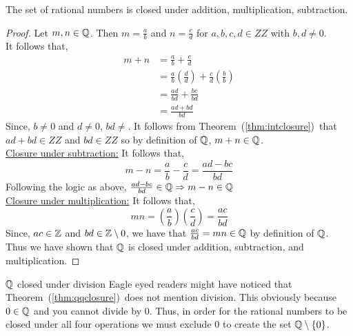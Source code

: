 \begin{tcolorbox}[colback=pink!70]
\begin{theorem}{\label{thm:qqclosure}}
    The set of rational numbers is closed under addition, multiplication, subtraction.
\end{theorem}
\begin{proof}
    Let $m, n \in \mathbb Q$. Then $m = \frac{a}{b}$ and $n = \frac{c}{d}$ for $a, b, c, d \in ZZ$ with $b, d \neq 0$.\\
     It follows that, 
    \begin{align*}
        m + n &= \frac{a}{b} + \frac{c}{d} \\
        &= \frac{a}{b}\left(\frac{d}{d}\right) + \frac{c}{d}\left(\frac{b}{b}\right) \\
        &= \frac{ad}{bd} + \frac{bc}{bd} \\
        &= \frac{ad + bd}{bd}
    \end{align*}
    Since, $b \neq 0$ and $d \neq 0$, $bd \neq$. It follows from Theorem~(\ref{thm:intclosure})~that $ad + bd \in ZZ$ and $bd \in ZZ$ so by definition of $\mathbb Q$, $m +n \in \mathbb Q$. \\

    \hspace*{2em} \underline{Closure under subtraction:} It follows that,
    \begin{equation*}
        m - n = \frac{a}{b} - \frac{c}{d} = \frac{ad - bc}{bd}
    \end{equation*}
    Following the logic as above, $\frac{ad - bc}{bd} \in \mathbb Q \Rightarrow m - n \in \mathbb Q$ \\
    \hspace*{2em} \underline{Closure under multiplication:} It follows that, 
    \begin{equation*}
        mn = \left(\frac{a}{b}\right)\left(\frac{c}{d}\right) = \frac{ac}{bd}
    \end{equation*}
    Since, $ac \in \mathbb Z$ and $bd \in \mathbb Z \setminus {0}$, we have that $\frac{ac}{bd} = mn \in \mathbb Q$ by definition of $\mathbb Q$. \\
    Thus we have shown that $\mathbb Q$ is closed under addition, subtraction, and multiplication.
\end{proof}
\end{tcolorbox}

\begin{note}{$\mathbb Q$ closed under division}{}
    Eagle eyed readers might have noticed that Theorem~(\ref{thm:qqclosure})~does not mention division. This obviously because $0 \in \mathbb Q$ and you cannot divide by $0$. Thus, in order for the rational numbers to be closed under all four operations we must exclude $0$ to create the set $\mathbb Q \setminus \{0\}$. 
\end{note}

